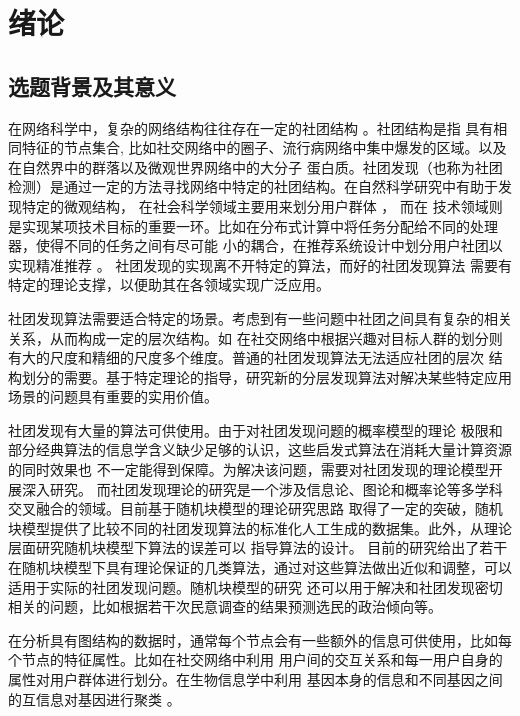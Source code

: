 
\chapter{绪论}


\section{选题背景及其意义}
在网络科学中，复杂的网络结构往往存在一定的社团结构 \cite{fortunato2010community} 。社团结构是指
具有相同特征的节点集合,
比如社交网络中的圈子、流行病网络中集中爆发的区域。以及在自然界中的群落以及微观世界网络中的大分子
蛋白质。社团发现（也称为社团检测）是通过一定的方法寻找网络中特定的社团结构。在自然科学研究中有助于发现特定的微观结构，
在社会科学领域主要用来划分用户群体 \cite{6750167}，
而在
技术领域则是实现某项技术目标的重要一环。比如在分布式计算中将任务分配给不同的处理器，使得不同的任务之间有尽可能
小的耦合\cite{topcuoglu2002performance}，在推荐系统设计中划分用户社团以实现精准推荐 \cite{10.1145/2739480.2754670}。
社团发现的实现离不开特定的算法，而好的社团发现算法
需要有特定的理论支撑，以便助其在各领域实现广泛应用。

社团发现算法需要适合特定的场景。考虑到有一些问题中社团之间具有复杂的相关关系，从而构成一定的层次结构。如
在社交网络中根据兴趣对目标人群的划分则有大的尺度和精细的尺度多个维度。普通的社团发现算法无法适应社团的层次
结构划分的需要。基于特定理论的指导，研究新的分层发现算法对解决某些特定应用场景的问题具有重要的实用价值。

社团发现有大量的算法可供使用。由于对社团发现问题的概率模型的理论
极限和部分经典算法的信息学含义缺少足够的认识，这些启发式算法在消耗大量计算资源的同时效果也
不一定能得到保障。为解决该问题，需要对社团发现的理论模型开展深入研究。
而社团发现理论的研究是一个涉及信息论、图论和概率论等多学科交叉融合的领域。目前基于随机块模型的理论研究思路
取得了一定的突破，随机块模型提供了比较不同的社团发现算法的标准化人工生成的数据集。此外，从理论层面研究随机块模型下算法的误差可以
指导算法的设计。
目前的研究给出了若干
在随机块模型下具有理论保证的几类算法，通过对这些算法做出近似和调整，可以适用于实际的社团发现问题。随机块模型的研究
还可以用于解决和社团发现密切相关的问题，比如根据若干次民意调查的结果预测选民的政治倾向等。

在分析具有图结构的数据时，通常每个节点会有一些额外的信息可供使用，比如每个节点的特征属性。比如在社交网络中利用
用户间的交互关系和每一用户自身的属性对用户群体进行划分。在生物信息学中利用
基因本身的信息和不同基因之间的互信息对基因进行聚类 \cite{4359897}。

